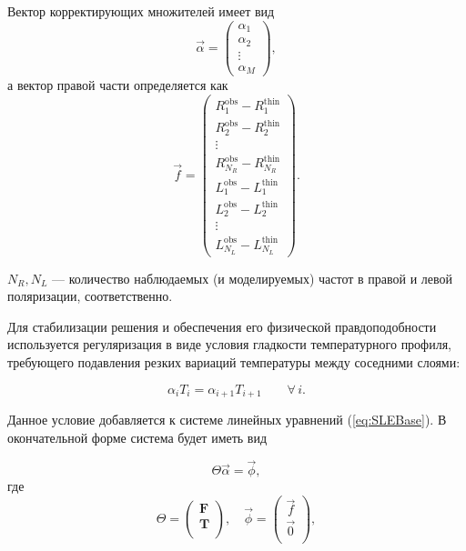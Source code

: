 \documentclass[
 aps, pra,
 amsmath,amssymb,
 11pt,
 final,
tightenlines,
 twoside,
 twocolumn,
 nofloats,
nofootinbib,
 superscriptaddress,
showkeys,
showkeywords,
 ]
{revtex4-2}
\begin{document}
Вектор корректирующих множителей имеет вид
\begin{equation}
\vec{\alpha} =
\left(
\begin{matrix}
\alpha_1 \\
\alpha_2 \\
\vdots \\
\alpha_M
\end{matrix}
\right),
\end{equation}
а вектор правой части определяется как
\begin{equation}
\vec{f} =
\left(
\begin{matrix}
R^{\mathrm{obs}}_{1} - R^{\mathrm{thin}}_{1} \\
R^{\mathrm{obs}}_{2} - R^{\mathrm{thin}}_{2} \\
\vdots \\
R^{\mathrm{obs}}_{N_R} - R^{\mathrm{thin}}_{N_R} \\
L^{\mathrm{obs}}_1 - L^{\mathrm{thin}}_1 \\
L^{\mathrm{obs}}_2 - L^{\mathrm{thin}}_2 \\
\vdots \\
L^{\mathrm{obs}}_{N_L} - L^{\mathrm{thin}}_{N_L}
\end{matrix}
\right).
\end{equation}

${N_R}, {N_L}$ --- количество наблюдаемых (и моделируемых) частот в правой и левой поляризации, соответственно.

Для стабилизации решения и обеспечения его физической правдоподобности используется регуляризация в виде условия гладкости температурного профиля, требующего подавления резких вариаций температуры между соседними слоями:

\begin{equation}
\alpha_i T_i = \alpha_{i+1} T_{i+1} \qquad \forall\, i .
\end{equation}

Данное условие добавляется к системе линейных уравнений (\ref{eq:SLEBase}). В окончательной форме система будет иметь вид

\begin{equation}
\Theta \vec \alpha = \vec \phi, 
\end{equation}
где
\begin{equation}
\Theta = \left( 
\begin{matrix}
\textbf{F} \\
\textbf{T} \\
\end{matrix}
\right), \quad \vec \phi = \left( 
\begin{matrix}
\vec f \\
\vec 0 \\
\end{matrix}
\right),
\end{equation}
\end{document}

